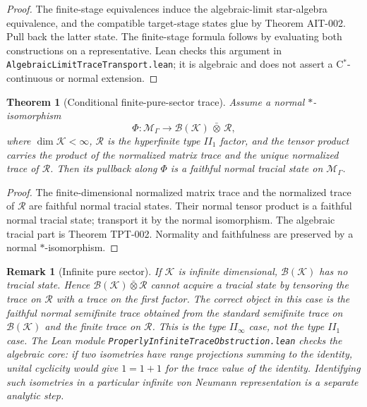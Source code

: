 \documentclass{article}
\newtheorem{theorem}[definition]{Theorem}
\newtheorem{remark}[definition]{Remark}
\newcommand{\cM}{\mathcal M}
\newcommand{\cR}{\mathcal R}
\newcommand{\cB}{\mathcal B}
\begin{document}
\begin{proof}
The finite-stage equivalences induce the algebraic-limit star-algebra
equivalence, and the compatible target-stage states glue by Theorem AIT-002.
Pull back the latter state.  The finite-stage formula follows by evaluating
both constructions on a representative.  Lean checks this argument in
\texttt{AlgebraicLimitTrace\-Transport.lean}; it is algebraic and does not
assert a C$^*$-continuous or normal extension.
\end{proof}

\begin{theorem}[Conditional finite-pure-sector trace]
Assume a normal \(*\)-isomorphism
\begin{equation*}
  \Phi:\cM_\Gamma \longrightarrow
  \cB(\mathcal K)\,\bar\otimes\,\cR,
\end{equation*}
where \(\dim\mathcal K<\infty\), \(\cR\) is the hyperfinite type
\(II_1\) factor, and the tensor product carries the product of the normalized
matrix trace and the unique normalized trace of \(\cR\).  Then its pullback
along \(\Phi\) is a faithful normal tracial state on \(\cM_\Gamma\).
\end{theorem}

\begin{proof}
The finite-dimensional normalized matrix trace and the normalized trace of
\(\cR\) are faithful normal tracial states.  Their normal tensor product is a
faithful normal tracial state; transport it by the normal isomorphism.  The
algebraic tracial part is Theorem TPT-002.  Normality and faithfulness are
preserved by a normal \(*\)-isomorphism.
\end{proof}

\begin{remark}[Infinite pure sector]
If \(\mathcal K\) is infinite dimensional, \(\cB(\mathcal K)\) has no
tracial state.  Hence \(\cB(\mathcal K)\bar\otimes\cR\) cannot acquire a
tracial state by tensoring the trace on \(\cR\) with a trace on the first
factor.  The correct object in this case is the faithful normal semifinite
trace obtained from the standard semifinite trace on \(\cB(\mathcal K)\) and
the finite trace on \(\cR\).  This is the type \(II_\infty\) case, not the
type \(II_1\) case.  The Lean module
\texttt{ProperlyInfiniteTraceObstruction.lean} checks the algebraic core: if
two isometries have range projections summing to the identity, unital cyclicity
would give \(1=1+1\) for the trace value of the identity.  Identifying such
isometries in a particular infinite von Neumann representation is a separate
analytic step.
\end{remark}
\end{document}
